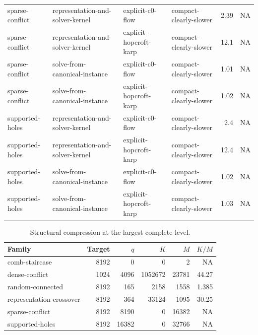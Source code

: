 \begin{table}[t]
\begin{tabular}{llllrr}
sparse-conflict & representation-and-solver-kernel & explicit-c0-flow & compact-clearly-slower & 2.39 & NA \\
sparse-conflict & representation-and-solver-kernel & explicit-hopcroft-karp & compact-clearly-slower & 12.1 & NA \\
sparse-conflict & solve-from-canonical-instance & explicit-c0-flow & compact-clearly-slower & 1.01 & NA \\
sparse-conflict & solve-from-canonical-instance & explicit-hopcroft-karp & compact-clearly-slower & 1.02 & NA \\
supported-holes & representation-and-solver-kernel & explicit-c0-flow & compact-clearly-slower & 2.4 & NA \\
supported-holes & representation-and-solver-kernel & explicit-hopcroft-karp & compact-clearly-slower & 12.4 & NA \\
supported-holes & solve-from-canonical-instance & explicit-c0-flow & compact-clearly-slower & 1.02 & NA \\
supported-holes & solve-from-canonical-instance & explicit-hopcroft-karp & compact-clearly-slower & 1.03 & NA \\
\bottomrule
\end{tabular}
\end{table}

\begin{table}[t]
\caption{Structural compression at the largest complete level.}
\label{tab:kernel-compression}
\begin{tabular}{lrrrrr}
\toprule
Family & Target & $q$ & $K$ & $M$ & $K/M$ \\
\midrule
comb-staircase & 8192 & 0 & 0 & 2 & NA \\
dense-conflict & 1024 & 4096 & 1052672 & 23781 & 44.27 \\
random-connected & 8192 & 165 & 2158 & 1558 & 1.385 \\
representation-crossover & 8192 & 364 & 33124 & 1095 & 30.25 \\
sparse-conflict & 8192 & 8190 & 0 & 16382 & NA \\
supported-holes & 8192 & 16382 & 0 & 32766 & NA \\
\bottomrule
\end{tabular}
\end{table}


